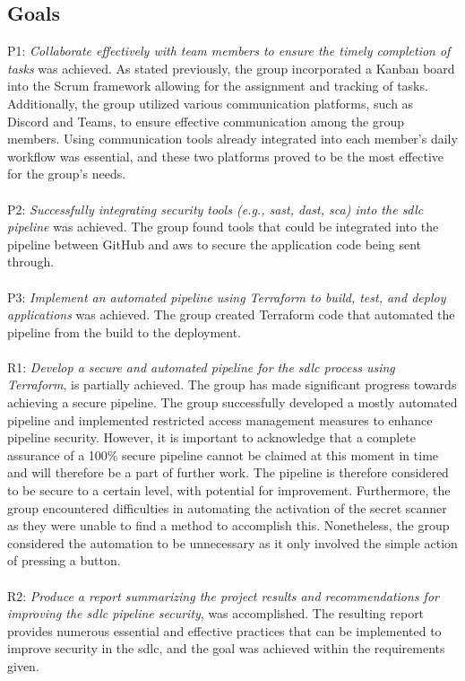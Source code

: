 \subsection{Goals}
P1: \textit{Collaborate effectively with team members to ensure the timely completion of tasks} was achieved. As stated previously, the group incorporated a Kanban board into the Scrum framework allowing for the assignment and tracking of tasks. Additionally, the group utilized various communication platforms, such as Discord and Teams, to ensure effective communication among the group members. Using communication tools already integrated into each member's daily workflow was essential, and these two platforms proved to be the most effective for the group's needs. 
\\~\\
P2: \textit{Successfully integrating security tools (e.g., \acrshort{sast}, \acrshort{dast}, \acrshort{sca}) into the \acrshort{sdlc} \gls{pipeline}} was achieved. The group found tools that could be integrated into the \gls{pipeline} between GitHub and \acrshort{aws} to secure the application code being sent through.
\\~\\
P3: \textit{Implement an automated \gls{pipeline} using Terraform to build, test, and deploy applications} was achieved. The group created Terraform code that automated the pipeline from the build to the deployment. 
\\~\\
R1: \textit{Develop a secure and automated \gls{pipeline} for the \acrshort{sdlc} process using Terraform}, is partially achieved. The group has made significant progress towards achieving a secure pipeline. The group successfully developed a mostly automated \acrshort{pipeline} and implemented restricted access management measures to enhance \gls{pipeline} security. However, it is important to acknowledge that a complete assurance of a 100\% secure \acrshort{pipeline} cannot be claimed at this moment in time and will therefore be a part of further work. The \acrshort{pipeline} is therefore considered to be secure to a certain level, with potential for improvement. Furthermore, the group encountered difficulties in automating the activation of the secret scanner as they were unable to find a method to accomplish this. Nonetheless, the group considered the automation to be unnecessary as it only involved the simple action of pressing a button.
\\~\\
R2: \textit{Produce a report summarizing the project results and recommendations for improving the \acrshort{sdlc} \gls{pipeline} security}, was accomplished. The resulting report provides numerous essential and effective practices that can be implemented to improve security in the \acrshort{sdlc}, and the goal was achieved within the requirements given. 

